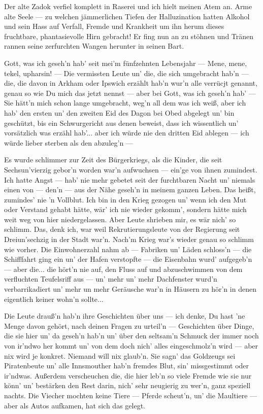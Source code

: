 Der alte Zadok verfiel komplett in Raserei und ich hielt meinen Atem an. Arme alte Seele --- zu welchen jämmerlichen Tiefen der Halluzination hatten Alkohol und sein Hass auf Verfall, Fremde und Krankheit um ihn herum dieses fruchtbare, phantasievolle Hirn gebracht! Er fing nun an zu stöhnen und Tränen rannen seine zerfurchten Wangen herunter in seinen Bart.

\glqq Gott, was ich geseh'n hab' seit mei'm fünfzehnten Lebensjahr --- Mene, mene, tekel, upharsin! --- Die vermissten Leute un' die, die sich umgebracht hab'n --- die, die davon in Arkham oder Ipswich erzählt hab'n wur'n alle verrücjt genannt, genau so wie Du mich das jetzt nennst --- aber bei Gott, was ich geseh'n hab' --- Sie hätt'n mich schon lange umgebracht, weg'n all dem was ich weiß, aber ich hab' den ersten un' den zweiten Eid des Dagon bei Obed abgelegt un' bin geschützt, bis ein Schwurgericht aus denen beweist, dass ich wissentlich un' vorsätzlich was erzähl hab'... aber ich würde nie den dritten Eid ablegen --- ich würde lieber sterben als den abzuleg'n ---

Es wurde schlimmer zur Zeit des Bürgerkriegs, als die Kinder, die seit Sechsun'vierzig gebor'n worden war'n aufwuchsen --- ein'ge von ihnen zumindest. Ich hatte Angst --- hab' nie mehr gebetet seit der furchtbaren Nacht un' niemals einen von --- den'n --- aus der Nähe geseh'n in meinem ganzen Leben. Das heißt, zumindes' nie 'n Vollblut. Ich bin in den Krieg gezogen un' wenn ich den Mut oder Verstand gehabt hätte, wär' ich nie wieder gekomm', sondern hätte mich weit weg von hier niedergelassen. Aber Leute shrieben mir, es wär nich' so schlimm. Das, denk ich, war weil Rekrutierungsleute von der Regierung seit Dreiun'sechzig in der Stadt war'n. Nach'm Krieg war's wieder genau so schlimm wie vorher. Die Einwohnerzahl nahm ab --- Fabriken un' Läden schloss'n --- die Schifffahrt ging ein un' der Hafen verstopfte --- die Eisenbahn wurd' aufgegeb'n --- aber die... die hört'n nie auf, den Fluss auf und abzuschwimmen von dem verfluchten Teufelsriff aus --- un' mehr un' mehr Dachfenster wurd'n verbarrikadiert un' mehr un mehr Geräusche war'n in Häusern zu hör'n in denen eigentlich keiner wohn'n sollte...

Die Leute drauß'n hab'n ihre Geschichten über uns --- ich denke, Du hast 'ne Menge davon gehört, nach deinen Fragen zu urteil'n --- Geschichten über Dinge, die sie hier un' da geseh'n hab'n un' über den seltsam'n Schmuck der immer noch von ir'ndwo her kommt un' von dem doch nich' alles eingeschmolz'n wird --- aber nix wird je konkret. Niemand will nix glaub'n. Sie sagn' das Goldzeugs sei Piratenbeute un' alle Innsmouther hab'n fremdes Blut, sin' missgestimmt oder ir'ndwas. Außerdem verscheuchen die, die hier leb'n so viele Fremde wie sie nur könn' un' bestärken den Rest darin, nich' sehr neugierig zu wer'n, ganz speziell nachts. Die Viecher mochten keine Tiere --- Pferde scheut'n, un' die Maultiere --- aber als Autos aufkamen, hat sich das gelegt.

